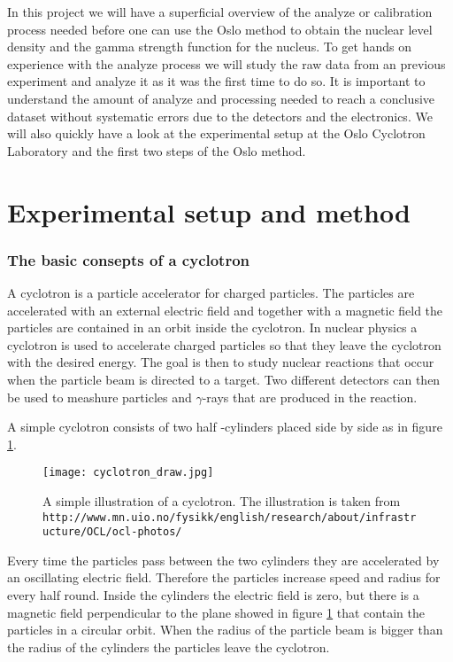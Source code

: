 \documentclass[11pt,a4wide]{article}
\begin{document}
In this project we will have a superficial overview of the analyze or calibration process needed before one can use the Oslo method to obtain the nuclear level density and the gamma strength function for the nucleus. To get hands on experience with the analyze process we will study the raw data from an previous experiment and analyze it as it was the first time to do so. It is important to understand the amount of analyze and processing needed to reach a conclusive dataset without systematic errors due to the detectors and the electronics.  We will also quickly have a look at the experimental setup at the Oslo Cyclotron Laboratory and the first two steps of the Oslo method. 


\section{Experimental setup and method}
\subsubsection*{The basic consepts of a cyclotron}
A cyclotron is a particle accelerator for charged particles. The particles are accelerated with an external electric field and together with a magnetic field the particles are contained in an orbit inside the cyclotron. In nuclear physics a cyclotron is used to accelerate charged particles so that they leave the cyclotron with the desired energy. The goal is then to study nuclear reactions that occur when the particle beam is directed to a target. Two different detectors can then be used to meashure particles and $\gamma$-rays that are produced in the reaction. 

A simple cyclotron consists of two half -cylinders placed side by side as in figure \ref{fig:cyclotron_draw}.
\begin{figure}[htp]
\centering
\texttt{[image: cyclotron\_draw.jpg]}
\caption{A simple illustration of a cyclotron. The illustration is taken from \texttt{http://www.mn.uio.no/fysikk/english/research/about/infrastructure/OCL/ocl-photos/}}
\label{fig:cyclotron_draw}
\end{figure}
Every time the particles pass between the two cylinders they are accelerated by an oscillating electric field. Therefore the particles increase speed and radius for every half round. Inside the cylinders the electric field is zero, but there is a magnetic field perpendicular to the plane showed in figure \ref{fig:cyclotron_draw} that contain the particles in a circular orbit. When the radius of the particle beam is bigger than the radius of the cylinders the particles leave the cyclotron. 
\end{document}

